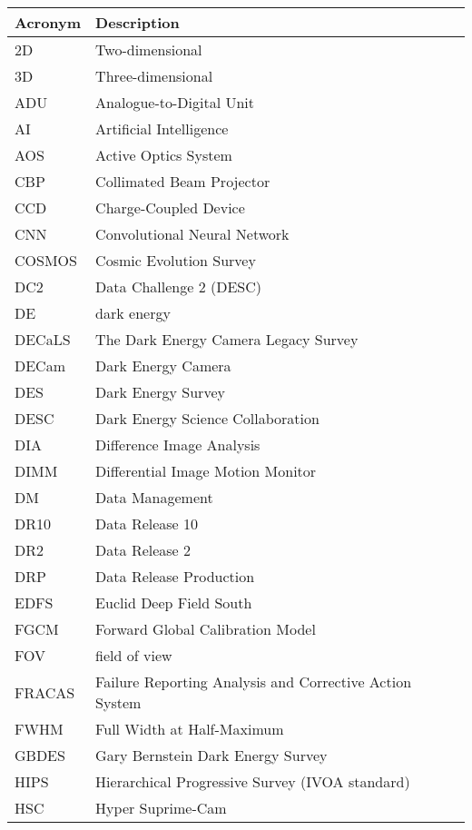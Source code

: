 \addtocounter{table}{-1}
\begin{longtable}{p{}p{}}\hline
\textbf{Acronym} & \textbf{Description}  \\\hline

2D & Two-dimensional \\\hline
3D & Three-dimensional \\\hline
ADU & Analogue-to-Digital Unit \\\hline
AI & Artificial Intelligence \\\hline
AOS & Active Optics System \\\hline
CBP & Collimated Beam Projector \\\hline
CCD & Charge-Coupled Device \\\hline
CNN & Convolutional Neural Network \\\hline
COSMOS & Cosmic Evolution Survey \\\hline
DC2 & Data Challenge 2 (DESC) \\\hline
DE & dark energy \\\hline
DECaLS & The Dark Energy Camera Legacy Survey \\\hline
DECam & Dark Energy Camera \\\hline
DES & Dark Energy Survey \\\hline
DESC & Dark Energy Science Collaboration \\\hline
DIA & Difference Image Analysis \\\hline
DIMM & Differential Image Motion Monitor \\\hline
DM & Data Management \\\hline
DR10 & Data Release 10 \\\hline
DR2 & Data Release 2 \\\hline
DRP & Data Release Production \\\hline
EDFS & Euclid Deep Field South \\\hline
FGCM & Forward Global Calibration Model \\\hline
FOV & field of view \\\hline
FRACAS & Failure Reporting Analysis and Corrective Action System \\\hline
FWHM & Full Width at Half-Maximum \\\hline
GBDES & Gary Bernstein Dark Energy Survey \\\hline
HIPS & Hierarchical Progressive Survey (IVOA standard) \\\hline
HSC & Hyper Suprime-Cam \\\hline

\end{longtable}
